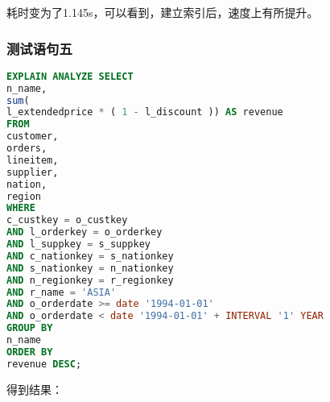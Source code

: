 \documentclass{article}
\begin{document}
耗时变为了1.145s，可以看到，建立索引后，速度上有所提升。

\subsubsection{测试语句五}

\begin{lstlisting}[language=sql]
EXPLAIN ANALYZE SELECT
n_name,
sum(
l_extendedprice * ( 1 - l_discount )) AS revenue 
FROM
customer,
orders,
lineitem,
supplier,
nation,
region 
WHERE
c_custkey = o_custkey 
AND l_orderkey = o_orderkey 
AND l_suppkey = s_suppkey 
AND c_nationkey = s_nationkey 
AND s_nationkey = n_nationkey 
AND n_regionkey = r_regionkey 
AND r_name = 'ASIA' 
AND o_orderdate >= date '1994-01-01' 
AND o_orderdate < date '1994-01-01' + INTERVAL '1' YEAR 
GROUP BY
n_name 
ORDER BY
revenue DESC;
\end{lstlisting}

得到结果：
\end{document}
